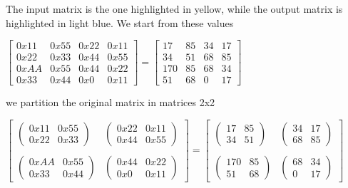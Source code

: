      The input matrix is the one highlighted in yellow, while the output matrix is highlighted in light blue.
     We start from these values \begin{center}
     	$ 
     	\begin{bmatrix}
     	0x11 & 0x55 & 0x22 & 0x11\\
     	0x22 & 0x33 & 0x44 & 0x55   	\\
     	0xAA&0x55 & 0x44  &  0x22 \\
     	0x33& 0x44 & 0x0 & 0x11
     	\end{bmatrix}= 	\begin{bmatrix}
     	17 &   85 &   34 &   17\\
     	34  &  51  &  68  &  85\\
     	170  &  85  &  68  &  34\\
     	51    &68    & 0    &17\end{bmatrix}$
     \end{center}
     \bigskip
     we partition the original matrix in matrices 2x2
     \begin{center}
     	$ 
     	\begin{bmatrix}
     	\begin{pmatrix}
     	0x11 & 0x55\\
     	0x22 & 0x33
     	\end{pmatrix}&
     	\begin{pmatrix}
     	0x22 & 0x11\\
     	0x44 & 0x55 
     	\end{pmatrix}\\
     	&\\
     	\begin{pmatrix}
     	0xAA&0x55\\
     	0x33& 0x44
     	\end{pmatrix}&
     	\begin{pmatrix}
     	0x44  &  0x22\\
     	0x0 & 0x11
     	\end{pmatrix}
     	\end{bmatrix}
     =\begin{bmatrix}
     \begin{pmatrix}
     17 &85\\
      34& 51
     \end{pmatrix}&
     \begin{pmatrix}
     34 & 17\\
     68& 85 
     \end{pmatrix}\\
     &\\
     \begin{pmatrix}
     170&85\\
     51&68
     \end{pmatrix}&
     \begin{pmatrix}
     68  &34\\
     0 & 17
     \end{pmatrix}
     	\end{bmatrix}$
     \end{center}\bigskip
